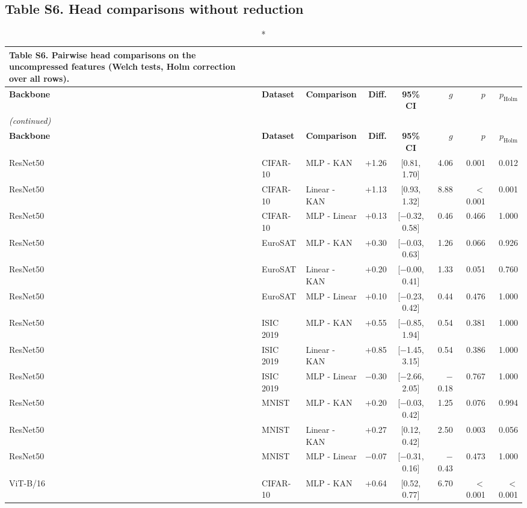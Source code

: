 \documentclass[10pt]{article}
\begin{document}
\subsection*{Table S6. Head comparisons without reduction}
\scriptsize
\setlength{\tabcolsep}{3pt}
\begin{longtable}{lllrcrrr}
\caption*{\textbf{Table S6.} Pairwise head comparisons on the uncompressed features (Welch tests, Holm correction over all rows).}\\
\toprule
\textbf{Backbone} & \textbf{Dataset} & \textbf{Comparison} & \textbf{Diff.} & \textbf{95\% CI} & \textbf{$g$} & \textbf{$p$} & \textbf{$p_{\mathrm{Holm}}$} \\
\midrule
\endfirsthead
\multicolumn{8}{l}{\textit{(continued)}}\\
\toprule
\textbf{Backbone} & \textbf{Dataset} & \textbf{Comparison} & \textbf{Diff.} & \textbf{95\% CI} & \textbf{$g$} & \textbf{$p$} & \textbf{$p_{\mathrm{Holm}}$} \\
\midrule
\endhead
\bottomrule
\endfoot
ResNet50 & CIFAR-10 & MLP - KAN & +1.26 & [0.81, 1.70] & 4.06 & 0.001 & 0.012 \\
ResNet50 & CIFAR-10 & Linear - KAN & +1.13 & [0.93, 1.32] & 8.88 & $<$0.001 & 0.001 \\
ResNet50 & CIFAR-10 & MLP - Linear & +0.13 & [$-$0.32, 0.58] & 0.46 & 0.466 & 1.000 \\
ResNet50 & EuroSAT & MLP - KAN & +0.30 & [$-$0.03, 0.63] & 1.26 & 0.066 & 0.926 \\
ResNet50 & EuroSAT & Linear - KAN & +0.20 & [$-$0.00, 0.41] & 1.33 & 0.051 & 0.760 \\
ResNet50 & EuroSAT & MLP - Linear & +0.10 & [$-$0.23, 0.42] & 0.44 & 0.476 & 1.000 \\
ResNet50 & ISIC 2019 & MLP - KAN & +0.55 & [$-$0.85, 1.94] & 0.54 & 0.381 & 1.000 \\
ResNet50 & ISIC 2019 & Linear - KAN & +0.85 & [$-$1.45, 3.15] & 0.54 & 0.386 & 1.000 \\
ResNet50 & ISIC 2019 & MLP - Linear & $-$0.30 & [$-$2.66, 2.05] & $-$0.18 & 0.767 & 1.000 \\
ResNet50 & MNIST & MLP - KAN & +0.20 & [$-$0.03, 0.42] & 1.25 & 0.076 & 0.994 \\
ResNet50 & MNIST & Linear - KAN & +0.27 & [0.12, 0.42] & 2.50 & 0.003 & 0.056 \\
ResNet50 & MNIST & MLP - Linear & $-$0.07 & [$-$0.31, 0.16] & $-$0.43 & 0.473 & 1.000 \\
ViT-B/16 & CIFAR-10 & MLP - KAN & +0.64 & [0.52, 0.77] & 6.70 & $<$0.001 & $<$0.001 \\

\end{longtable}
\end{document}
